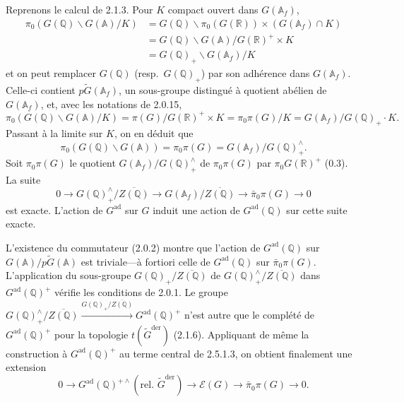 \documentclass[12pt,a4paper]{article}
\theoremstyle{plain}
\theoremstyle{definition}
\theoremstyle{remark}
\newcommand{\QQ}{\mathbb{Q}}
\newcommand{\RR}{\mathbb{R}}
\newcommand{\Af}{\mathbb{A}_f}
\newcommand{\A}{\mathbb{A}}
\begin{document}
Reprenons le calcul de 2.1.3. Pour $K$ compact ouvert dans $G(\Af)$,
\begin{equation}\label{eq:2.5.1.1}
\begin{split}
\pi_0(G(\QQ)\backslash G(\A)/K) &= G(\QQ)\backslash \pi_0(G(\RR)) \times (G(\Af) \cap K) \\
&= G(\QQ)\backslash G(\A)/G(\RR)^+ \times K \\
&= G(\QQ)_+\backslash G(\Af)/K
\end{split}
\end{equation}
et on peut remplacer $G(\QQ)$ (resp.~$G(\QQ)_+$) par son adh\'erence dans $G(\Af)$. Celle-ci contient $p\tilde{G}(\Af)$, un sous-groupe distingu\'e \`a quotient ab\'elien de $G(\Af)$, et, avec les notations de 2.0.15,
\begin{equation}\label{eq:2.5.1.2}
\pi_0(G(\QQ)\backslash G(\A)/K) = \pi(G)/G(\RR)^+ \times K = \pi_0\pi(G)/K = G(\Af)/G(\QQ)_+ \cdot K.
\end{equation}
Passant \`a la limite sur $K$, on en d\'eduit que
\[
\pi_0(G(\QQ)\backslash G(\A)) = \pi_0\pi(G) = G(\Af)/G(\QQ)_+^{\wedge}.
\]
Soit $\pi_0\pi(G)$ le quotient $G(\Af)/G(\QQ)_+^{\wedge}$ de $\pi_0\pi(G)$ par $\pi_0 G(\RR)^+$ (0.3). La suite
\begin{equation}\label{eq:2.5.1.3}
0 \to G(\QQ)_+^{\wedge}/\overline{Z(\QQ)} \to G(\Af)/\overline{Z(\QQ)} \to \bar{\pi}_0\pi(G) \to 0
\end{equation}
est exacte. L'action de $G^{\text{ad}}$ sur $G$ induit une action de $G^{\text{ad}}(\QQ)$ sur cette suite exacte.

L'existence du commutateur (2.0.2) montre que l'action de $G^{\text{ad}}(\QQ)$ sur $G(\A)/p\tilde{G}(\A)$ est triviale---\`a fortiori celle de $G^{\text{ad}}(\QQ)$ sur $\bar{\pi}_0\pi(G)$. L'application du sous-groupe $G(\QQ)_+/\overline{Z(\QQ)}$ de $G(\QQ)_+^{\wedge}/\overline{Z(\QQ)}$ dans $G^{\text{ad}}(\QQ)^+$ v\'erifie les conditions de 2.0.1. Le groupe $G(\QQ)_+^{\wedge}/\overline{Z(\QQ)} \xrightarrow{G(\QQ)_+/\overline{Z(\QQ)}} G^{\text{ad}}(\QQ)^+$ n'est autre que le compl\'et\'e de $G^{\text{ad}}(\QQ)^+$ pour la topologie $t(\tilde{G}^{\text{der}})$ (2.1.6). Appliquant de m\^eme la construction \`a $G^{\text{ad}}(\QQ)^+$ au terme central de 2.5.1.3, on obtient finalement une extension
\begin{equation}\label{eq:2.5.1.4}
0 \to G^{\text{ad}}(\QQ)^{+\wedge}(\text{rel.~}\tilde{G}^{\text{der}}) \to \mathscr{E}(G) \to \bar{\pi}_0\pi(G) \to 0.
\end{equation}
\end{document}
